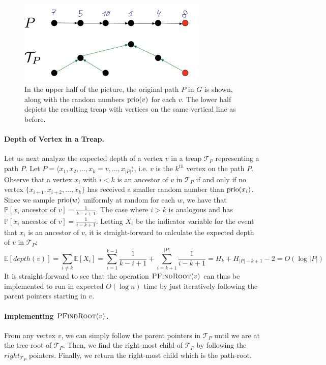 \begin{figure}[!ht]
    \centering
    \includegraphics[width=0.8\textwidth]{./fig/PathRepTreap_lectureDynamicTree.png}
    \caption{In the upper half of the picture, the original path $P$ in $G$ is shown, along with the random numbers $\operatorname{prio}(v)$ for each $v$. The lower half depicts the resulting treap with vertices on the same vertical line as before.}
    \label{fig:PathAsTreap}
\end{figure}

\paragraph{Depth of Vertex in a Treap.} Let us next analyze the expected depth of a vertex $v$ in a treap $\mathcal{T}_{P}$ representing a path $P$. Let $P = \langle x_1, x_2, \dots, x_k = v, \dots, x_{|P|}\rangle$, i.e. $v$ is the $k^{th}$ vertex on the path $P$. Observe that a vertex $x_i$ with $i < k$ is an ancestor of $v$ in $\mathcal{T}_{P}$ if and only if no vertex $\{x_{i+1}, x_{i+2}, \dots, x_k\}$ has received a smaller random number than $\operatorname{prio}(x_i)$. Since we sample $\operatorname{prio}(w)$ uniformly at random for each $w$, we have that $\mathbb{P}[x_i \text{ ancestor of } v] = \frac{1}{k-i+1}$. The case where $i > k$ is analogous and has $\mathbb{P}[x_i \text{ ancestor of } v] = \frac{1}{i-k+1}$. Letting $X_i$ be the indicator variable for the event that $x_i$ is an ancestor of $v$, it is straight-forward to calculate the expected depth of $v$ in $\mathcal{T}_{P}$:
\[
    \mathbb{E}[depth(v)] = \sum_{i \neq k} \mathbb{E}[X_i] =  \sum_{i = 1}^{k-1}\frac{1}{k-i+1} + \sum_{i = k+1}^{|P|} \frac{1}{i-k+1} = H_k + H_{|P|-k+1} - 2 = O(\log |P|)
\]
It is straight-forward to see that the operation $\textsc{PFindRoot}(v)$ can thus be implemented to run in expected $O(\log n)$ time by just iteratively following the parent pointers starting in $v$.

\paragraph{Implementing $\textsc{PFindRoot}(v)$.} From any vertex $v$, we can simply follow the parent pointers in $\mathcal{T}_{P}$ until we are at the tree-root of $\mathcal{T}_{P}$. Then, we find the right-most child of $\mathcal{T}_{P}$ by following the $right_{\mathcal{T}_{P}}$ pointers. Finally, we return the right-most child which is the path-root.

